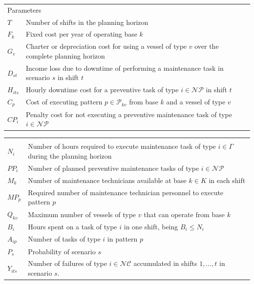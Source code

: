 \begin{tabular}{ll}
	\\
  \multicolumn{2}{l}{Parameters}\\
	$T$ & Number of shifts in the planning horizon\\
	$F_{k}$ 	&	Fixed cost per year of operating base $k$\\
	$G_{v}$ 	&	\parbox[t]{10cm}{Charter or depreciation cost for using a vessel of type $v$ over the complete planning horizon}\\
	$D_{st}$	&	\parbox[t]{10cm}{Income loss due to downtime of performing a maintenance task in scenario $s$ in shift $t$} \\
	$H_{its}$ 		&	\parbox[t]{10cm}{Hourly downtime cost for a preventive  task of type $i\in \mathcal{NP}$ in shift $t$}\\
	$C_{p}$ 	&	\parbox[t]{10cm}{Cost of executing pattern $p\in \mathcal{P}_{kv}$ from base $k$ and a vessel of type $v$ }\\
	$CP_i$ 	&	\parbox[t]{10cm}{Penalty cost for not executing a preventive maintenance task of type $i\in \mathcal{NP}$}\\
	\end{tabular}
	
\begin{tabular}{ll}
  \multicolumn{2}{l}{}\\	
	$N_{i}$ 		&	\parbox[t]{10cm}{Number of hours required to execute maintenance task of type $i\in \Gamma$ during the planning horizon}\\
	$PP_{i}$ 		&	Number of planned preventive maintenance tasks of type $i\in \mathcal{NP}$\\	
	$M_{k}$ 		&	\parbox[t]{10cm}{Number of maintenance technicians available at base $k\in K$ in each shift}\\
	$MP_{p}$ 		&	\parbox[t]{10cm}{Required number of maintenance technician personnel to execute pattern $p$} \\
	$Q_{kv}$ 	&	\parbox[t]{10cm}{Maximum number of vessels of type $v$ that can operate from base $k$}\\
	$B_{i}$ &	\parbox[t]{10cm}{Hours spent on a task of type $i$ in one shift, being $B_i \leq N_i$}\\
	$A_{ip}$ 		&	\parbox[t]{10cm}{Number of tasks of type $i$ in pattern $p$}\\
	$P_s$ 		&	Probability of scenario $s$\\
	$Y_{its}$ 	& 	\parbox[t]{10cm}{Number of failures of type $i\in\mathcal{NC}$ accumulated in shifts $1,\ldots,t$ in scenario $s$}.
	\\
\end{tabular}

